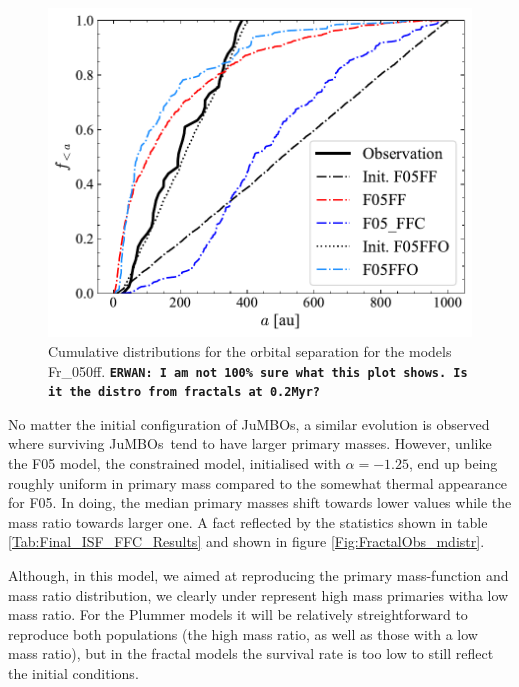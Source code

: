 \documentclass[submission,phys]{lib/SciPost}
\newcommand{\erwan}[1] {{\texttt{\textbf{ERWAN: #1}}} }
\newcommand{\jumbos}{\mbox{JuMBOs}}
\begin{document}
\begin{figure}
    \centering
    \includegraphics[width=0.49\columnwidth]{figures/Fractal_FF_sem_axis_crop.pdf}
    \caption{Cumulative distributions for the orbital separation for
      the models Fr\_050ff.
      \erwan{I am not 100\% sure what this plot shows. Is it the distro from fractals at 0.2Myr?}
    }
         \label{Fig:Semi_Fractal}
\end{figure}

No matter the initial configuration of \jumbos, a similar evolution is
observed where surviving \jumbos\, tend to have larger primary
masses. However, unlike the F05 model, the constrained model,
initialised with $\alpha = -1.25$, end up being roughly uniform in
primary mass compared to the somewhat thermal appearance for F05. In
doing, the median primary masses shift towards lower values while the
mass ratio towards larger one. A fact reflected by the statistics
shown in table \ref{Tab:Final_ISF_FFC_Results} and shown in figure
\ref{Fig:FractalObs_mdistr}.

Although, in this model, we aimed at reproducing the primary
mass-function and mass ratio distribution, we clearly under represent
high mass primaries witha low mass ratio. For the Plummer models it
will be relatively streightforward to reproduce both populations (the
high mass ratio, as well as those with a low mass ratio), but in the
fractal models the survival rate is too low to still reflect the
initial conditions.
\end{document}

